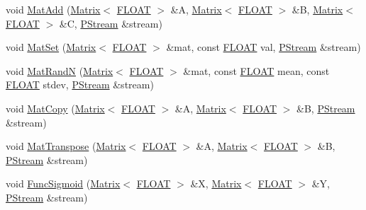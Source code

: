 \begin{DoxyCompactItemize}
\item 
void \hyperlink{classfractal_1_1Engine_a4b9525243e39da8b02c6de0d297f78a2}{Mat\+Add} (\hyperlink{classfractal_1_1Matrix}{Matrix}$<$ \hyperlink{namespacefractal_a1c2d2530689575d5ccb56bae52af70d3}{F\+L\+O\+A\+T} $>$ \&A, \hyperlink{classfractal_1_1Matrix}{Matrix}$<$ \hyperlink{namespacefractal_a1c2d2530689575d5ccb56bae52af70d3}{F\+L\+O\+A\+T} $>$ \&B, \hyperlink{classfractal_1_1Matrix}{Matrix}$<$ \hyperlink{namespacefractal_a1c2d2530689575d5ccb56bae52af70d3}{F\+L\+O\+A\+T} $>$ \&C, \hyperlink{classfractal_1_1PStream}{P\+Stream} \&stream)
\item 
void \hyperlink{classfractal_1_1Engine_aaf52ba79666cb6803b7b47648b2f9695}{Mat\+Set} (\hyperlink{classfractal_1_1Matrix}{Matrix}$<$ \hyperlink{namespacefractal_a1c2d2530689575d5ccb56bae52af70d3}{F\+L\+O\+A\+T} $>$ \&mat, const \hyperlink{namespacefractal_a1c2d2530689575d5ccb56bae52af70d3}{F\+L\+O\+A\+T} val, \hyperlink{classfractal_1_1PStream}{P\+Stream} \&stream)
\item 
void \hyperlink{classfractal_1_1Engine_aa23cc72f5e2f83fafb4ebbbbf5da23a1}{Mat\+Rand\+N} (\hyperlink{classfractal_1_1Matrix}{Matrix}$<$ \hyperlink{namespacefractal_a1c2d2530689575d5ccb56bae52af70d3}{F\+L\+O\+A\+T} $>$ \&mat, const \hyperlink{namespacefractal_a1c2d2530689575d5ccb56bae52af70d3}{F\+L\+O\+A\+T} mean, const \hyperlink{namespacefractal_a1c2d2530689575d5ccb56bae52af70d3}{F\+L\+O\+A\+T} stdev, \hyperlink{classfractal_1_1PStream}{P\+Stream} \&stream)
\item 
void \hyperlink{classfractal_1_1Engine_aa15f5b72bd80d305036151bc1fafe848}{Mat\+Copy} (\hyperlink{classfractal_1_1Matrix}{Matrix}$<$ \hyperlink{namespacefractal_a1c2d2530689575d5ccb56bae52af70d3}{F\+L\+O\+A\+T} $>$ \&A, \hyperlink{classfractal_1_1Matrix}{Matrix}$<$ \hyperlink{namespacefractal_a1c2d2530689575d5ccb56bae52af70d3}{F\+L\+O\+A\+T} $>$ \&B, \hyperlink{classfractal_1_1PStream}{P\+Stream} \&stream)
\item 
void \hyperlink{classfractal_1_1Engine_a75edbac141ebf67953ec5a6934fb7e6e}{Mat\+Transpose} (\hyperlink{classfractal_1_1Matrix}{Matrix}$<$ \hyperlink{namespacefractal_a1c2d2530689575d5ccb56bae52af70d3}{F\+L\+O\+A\+T} $>$ \&A, \hyperlink{classfractal_1_1Matrix}{Matrix}$<$ \hyperlink{namespacefractal_a1c2d2530689575d5ccb56bae52af70d3}{F\+L\+O\+A\+T} $>$ \&B, \hyperlink{classfractal_1_1PStream}{P\+Stream} \&stream)
\item 
void \hyperlink{classfractal_1_1Engine_a02808643a0a582b6b357d077e8355cd4}{Func\+Sigmoid} (\hyperlink{classfractal_1_1Matrix}{Matrix}$<$ \hyperlink{namespacefractal_a1c2d2530689575d5ccb56bae52af70d3}{F\+L\+O\+A\+T} $>$ \&X, \hyperlink{classfractal_1_1Matrix}{Matrix}$<$ \hyperlink{namespacefractal_a1c2d2530689575d5ccb56bae52af70d3}{F\+L\+O\+A\+T} $>$ \&Y, \hyperlink{classfractal_1_1PStream}{P\+Stream} \&stream)

\end{DoxyCompactItemize}

